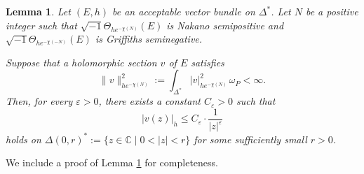 \documentclass[12pt,twoside]{amsart}
\newtheorem{lem}[thm]{Lemma}
\theoremstyle{definition}
\begin{document}
\begin{lem}\label{p-lem5.3}
Let $(E, h)$ be an acceptable vector bundle on $\Delta^*$.  
Let $N$ be a positive integer such that  
$\sqrt{-1} \Theta_{he^{-\chi(N)}}(E)$ is Nakano semipositive and  
$\sqrt{-1} \Theta_{he^{-\chi(-N)}}(E)$ is Griffiths seminegative.  

Suppose that a holomorphic section $v$ of $E$ satisfies  
\[
\|v\|^2_{he^{-\chi(N)}} := \int_{\Delta^*} |v|^2_{he^{-\chi(N)}} \, \omega_P < \infty.
\]  
Then, for every $\varepsilon > 0$, there exists a constant $C_\varepsilon > 0$ such that  
\[
|v(z)|_h \leq C_\varepsilon \cdot \frac{1}{|z|^\varepsilon}
\]  
holds on $\Delta(0, r)^* := \{ z \in \mathbb{C} 
\mid 0 < |z| < r \}$ for some sufficiently small $r > 0$.
\end{lem}

We include a proof of Lemma \ref{p-lem5.3} for completeness.
\end{document}
